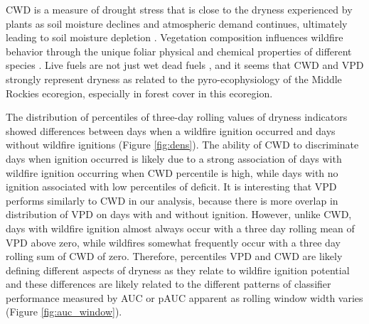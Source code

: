 \documentclass[11p]{article}
\begin{document}
\begin{table}
{CWD is a measure of drought stress that is close to the dryness experienced by plants as soil moisture declines and atmospheric demand continues, ultimately leading to soil moisture depletion \citep{stephensonActualEvapotranspirationDeficit1998}. Vegetation composition influences wildfire behavior through the unique foliar physical and chemical properties of different species \citep{mattjollySeasonalVariationsRed2016}. Live fuels are not just wet dead fuels \citep{jollyPyroEcophysiologyShiftingParadigm2018}, and it seems that CWD and VPD strongly represent dryness as related to the pyro-ecophysiology of the Middle Rockies ecoregion, especially in forest cover in this ecoregion.

The distribution of percentiles of three-day rolling values of dryness indicators showed differences between days when a wildfire ignition occurred and days without wildfire ignitions (Figure \ref{fig:dens}). The ability of CWD to discriminate days when ignition occurred is likely due to a strong association of days with wildfire ignition occurring when CWD percentile is high, while days with no ignition associated with low percentiles of deficit. It is interesting that VPD performs similarly to CWD in our analysis, because there is more overlap in distribution of VPD on days with and without ignition. However, unlike CWD, days with wildfire ignition almost always occur with a three day rolling mean of VPD above zero, while wildfires somewhat frequently occur with a three day rolling sum of CWD of zero. Therefore, percentiles VPD and CWD are likely defining different aspects of dryness as they relate to wildfire ignition potential and these differences are likely related to the different patterns of classifier performance measured by AUC or pAUC apparent as rolling window width varies (Figure \ref{fig:auc_window}).

}
\end{table}
\end{document}
